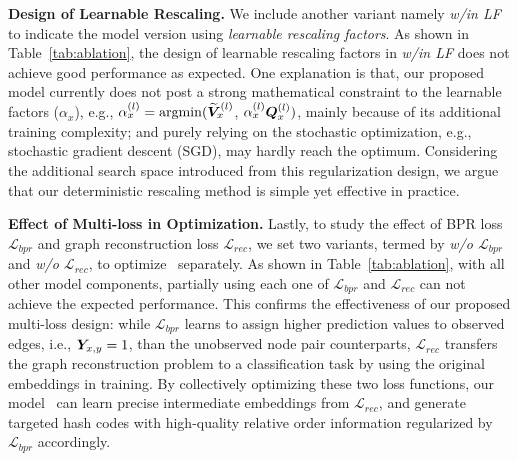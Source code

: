 {\textbf{Design of Learnable Rescaling.}}
We include another variant namely \textsl{w/in LF} to indicate the model version using \textit{learnable rescaling factors}. 
As shown in Table~\ref{tab:ablation}, the design of learnable rescaling factors in \textsl{w/in LF} does not achieve good performance as expected. 
One explanation is that, our proposed model currently does not post a strong mathematical constraint to the learnable factors ($\alpha_x$), e.g., $\alpha_x^{(l)} = \operatorname{argmin}(\widetilde{\boldsymbol{V}}^{(l)}_x$, $\alpha_x^{(l)} \boldsymbol{{Q}}^{(l)}_x)$, mainly because of its additional training complexity; and purely relying on the stochastic optimization, e.g., stochastic gradient descent (SGD), may hardly reach the optimum.
Considering the additional search space introduced from this regularization design, we argue that our deterministic rescaling method is simple yet effective in practice.



{\textbf{Effect of Multi-loss in Optimization.}}
Lastly, to study the effect of BPR loss $\mathcal{L}_{bpr}$ and graph reconstruction loss $\mathcal{L}_{rec}$, we set two variants, termed by \textsl{w/o $\mathcal{L}_{bpr}$} and \textsl{w/o $\mathcal{L}_{rec}$}, to optimize \model~separately.
As shown in Table~\ref{tab:ablation}, with all other model components, partially using each one of $\mathcal{L}_{bpr}$ and $\mathcal{L}_{rec}$ can not achieve the expected performance.
This confirms the effectiveness of our proposed multi-loss design:
while $\mathcal{L}_{bpr}$ learns to assign higher prediction values to observed edges, i.e., $\boldsymbol{Y}_{x,y}=1$, than the unobserved node pair counterparts, 
$\mathcal{L}_{rec}$ transfers the graph reconstruction problem to a classification task by using the original embeddings in training.
By collectively optimizing these two loss functions, our model \model~can learn precise intermediate embeddings from $\mathcal{L}_{rec}$, and generate targeted hash codes with high-quality relative order information regularized by $\mathcal{L}_{bpr}$ accordingly.



